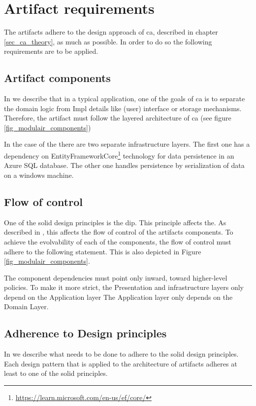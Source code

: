 \section{Artifact requirements} \label{sec_artifact_requirements}

The artifacts adhere to the design approach of \gls{ca}, described in chapter
\ref{sec_ca_theory}, as much as possible. In order to do so the following
requirements are to be applied.

\subsection{Artifact components}
In  we describe that in a typical application, one of the goals of
\gls{ca} is to separate the domain logic from Impl details like (user) interface
or storage mechanisms. Therefore, the artifact must follow the layered architecture of
\gls{ca} (see figure \ref{fig_modulair_components})

In the case of the  there are two separate infrastructure
layers. The first one has a dependency on
EntityFrameworkCore\footnote{\url{https://learn.microsoft.com/en-us/ef/core/}} technology
for data persistence in an Azure SQL database. The other one handles persistence by
serialization of data on a windows machine.

\subsection{Flow of control}
One of the \gls{solid} design principles is the \acrfull{dip}. This principle affects the.
As described in , this affects the flow of control of the
artifacts components. To achieve the evolvability of each of the components, the flow of
control must adhere to the following statement. This is also depicted in Figure
\ref{fig_modulair_components}.

The component dependencies must point only inward, toward higher-level policies. To make
it more strict, the Presentation and infrastructure layers only depend on the Application
layer The Application layer only depends on the  Domain Layer.

\subsection{Adherence to Design principles}
In  we describe what needs to be done to adhere to the
\gls{solid} design principles. Each design pattern that is applied to the architecture of
artifacts adheres at least to one of the \gls{solid} principles.


